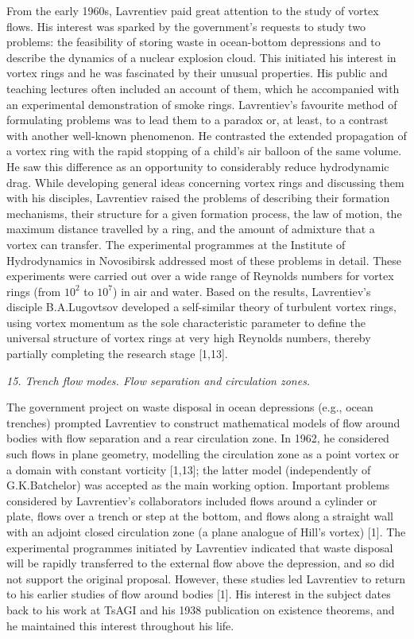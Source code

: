 \documentclass[%
 reprint,
onecolumn,
 amsmath,amssymb, aps,
]{revtex4-2}
\numberwithin{equation}{section}
\begin{document}
From the early 1960s, Lavrentiev paid great attention to the study of vortex flows.
His interest was sparked by the government's requests to study two problems: the feasibility of storing waste in ocean-bottom depressions and to describe the dynamics of a nuclear explosion cloud.
This initiated his interest in vortex rings and he was fascinated by their unusual properties.
His public and teaching lectures often included an account of them, which he accompanied with an experimental demonstration of smoke rings.
Lavrentiev's favourite method of formulating problems was to lead them to a paradox or, at least, to a contrast with another well-known phenomenon.
 He contrasted the extended propagation of a vortex ring with the rapid stopping of a child's air balloon of the same volume.
He saw this difference as an opportunity to considerably reduce hydrodynamic drag.
While developing general ideas concerning vortex rings and discussing them with his disciples, Lavrentiev raised the problems of describing their formation mechanisms, their structure for a given formation process, the law of motion, the maximum distance travelled by a ring, and the amount of admixture that a vortex can transfer.
The experimental programmes at the Institute of Hydrodynamics in Novosibirsk addressed most of these problems in detail.
These experiments were carried out over a wide range of Reynolds numbers for vortex rings (from $10^2$ to $10^7$) in air and water.
Based on the results, Lavrentiev's disciple B.A.Lugovtsov developed a self-similar theory of turbulent vortex rings, using vortex momentum as the sole characteristic parameter to define the universal structure of vortex rings at very high Reynolds numbers, thereby partially completing the research stage [1,13].

\vspace{3mm}
\textit{15. Trench flow modes. Flow separation and circulation zones.}
\vspace{1mm}

The government project on waste disposal in ocean depressions (e.g., ocean trenches) prompted  Lavrentiev to construct mathematical models of flow around bodies with flow separation and a rear circulation zone.
In 1962, he considered such flows in plane geometry, modelling the circulation zone as a point vortex or a domain with constant vorticity [1,13]; the latter model
 (independently of G.K.Batchelor) was accepted as the main working option.
Important problems considered by Lavrentiev’s collaborators included flows around a cylinder or plate, flows over a trench or step at the bottom, and flows along a straight wall with an adjoint closed circulation zone (a plane analogue of Hill's vortex) [1].
The experimental programmes initiated by Lavrentiev indicated that waste disposal will be rapidly transferred to the external flow above the depression, and so did not support the original proposal.
However, these studies led Lavrentiev to return to his earlier studies of flow around bodies [1].
His interest in the subject dates back to his work at TsAGI and his 1938 publication on existence theorems, and he maintained this interest throughout his life.
\end{document}
